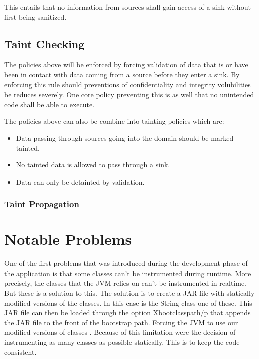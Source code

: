 This entails that no information from sources shall gain access of a sink without first being sanitized.


\subsection{Taint Checking}
The policies above will be enforced by forcing validation of data that is or have been in contact with data coming from a source before they enter a sink. By enforcing this rule should preventions of confidentiality and integrity volubilities be reduces severely. One core policy preventing this is as well that no unintended code shall be able to execute.

The policies above can also be combine into tainting policies which are:

\hfill
\begin{itemize}
	\item Data passing through sources going into the domain should be marked tainted.
	\item No tainted data is allowed to pass through a sink.
	\item Data can only be detainted by validation.
\end{itemize}
\hfill


\subsubsection{Taint Propagation}



\section{Notable Problems}
\label{NotableProblems}
One of the first problems that was introduced during the development phase of the application is that some classes can't be instrumented during runtime. More precisely, the classes that the JVM relies on can't be instrumented in realtime. But these is a solution to this. The solution is to create a JAR file with statically modified versions of the classes. In this case is the String class one of these. This JAR file can then be loaded through the option Xbootclasspath/p that appends the JAR file to the front of the bootstrap path. Forcing the JVM to use our modified versions of classes \parencite{xboot}. Because of this limitation were the decision of instrumenting as many classes as possible statically. This is to keep the code consistent.

